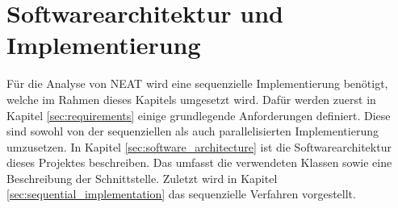 \chapter{Softwarearchitektur und Implementierung}
\label{chap:software_architecture}
Für die Analyse von \ac{NEAT} wird eine sequenzielle Implementierung benötigt, welche im Rahmen dieses Kapitels umgesetzt wird. Dafür werden zuerst in Kapitel \ref{sec:requirements} einige grundlegende Anforderungen definiert. Diese sind sowohl von der sequenziellen als auch parallelisierten Implementierung umzusetzen. In Kapitel \ref{sec:software_architecture} ist die Softwarearchitektur dieses Projektes beschreiben. Das umfasst die verwendeten Klassen sowie eine Beschreibung der Schnittstelle. Zuletzt wird in Kapitel \ref{sec:sequential_implementation} das sequenzielle Verfahren vorgestellt.


